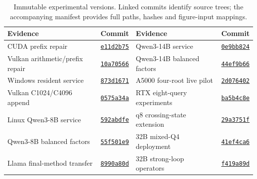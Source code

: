 \begin{table}[t]
\centering\footnotesize\tighttable
\caption{Immutable experimental versions. Linked commits identify source trees; the accompanying manifest provides full paths, hashes and figure-input mappings.}
\label{tab:source-versions}
\begin{tabularx}{\textwidth}{@{}YlYl@{}}\toprule
Evidence & Commit & Evidence & Commit\\\midrule
CUDA prefix repair & \href{https://github.com/leecdiang/HeteroSpec/tree/e11d2b75d82422409ba2b701aa38c59f36acc50b}{\texttt{e11d2b75}} & Qwen3-14B service & \href{https://github.com/leecdiang/HeteroSpec/tree/0e9bb82432dc0a860a43ab9ba1c034f41176fe05}{\texttt{0e9bb824}} \\
Vulkan arithmetic/prefix repair & \href{https://github.com/leecdiang/HeteroSpec/tree/10a70566ce01ab707dbdcc57d8270c1434088f07}{\texttt{10a70566}} & Qwen3-14B balanced factors & \href{https://github.com/leecdiang/HeteroSpec/tree/44ef9b6654cfe3a800059d7311f8ecf73ffd8983}{\texttt{44ef9b66}} \\
Windows resident service & \href{https://github.com/leecdiang/HeteroSpec/tree/873d16712fbf3bc04f54e9b3753515c5dbebb60f}{\texttt{873d1671}} & A5000 four-root live pilot & \href{https://github.com/leecdiang/HeteroSpec/tree/2d076402b4ddc29c92549d360cd974af40d3f0a4}{\texttt{2d076402}} \\
Vulkan C1024/C4096 append & \href{https://github.com/leecdiang/HeteroSpec/tree/0575a34a88acff8298191e172205bf8726fe4174}{\texttt{0575a34a}} & RTX eight-query experiments & \href{https://github.com/leecdiang/HeteroSpec/tree/ba5b4c8e01d50d4bfaab1ac3908f798347be063a}{\texttt{ba5b4c8e}} \\
Linux Qwen3-8B service & \href{https://github.com/leecdiang/HeteroSpec/tree/592abdfe9267fd97ecbde18cd0ee9a1bfc319e20}{\texttt{592abdfe}} & q8 crossing-state extension & \href{https://github.com/leecdiang/HeteroSpec/tree/29a3751f3745668f287a8dcc3b2ad2c0d15bdc43}{\texttt{29a3751f}} \\
Qwen3-8B balanced factors & \href{https://github.com/leecdiang/HeteroSpec/tree/55f501e9a93013a4b4d82cc4967e82b8d9054a81}{\texttt{55f501e9}} & 32B mixed-Q4 deployment & \href{https://github.com/leecdiang/HeteroSpec/tree/41ef4ca6bbc382c02fb97ebea874651fbf9fd4ac}{\texttt{41ef4ca6}} \\
Llama final-method transfer & \href{https://github.com/leecdiang/HeteroSpec/tree/8990a80da23f75c071d6d161c8c79a2dc1347bd7}{\texttt{8990a80d}} & 32B strong-loop operators & \href{https://github.com/leecdiang/HeteroSpec/tree/f419a89d54f4ec93b4c9c328b4ea9f416ae3c989}{\texttt{f419a89d}} \\
\bottomrule
\end{tabularx}
\end{table}


